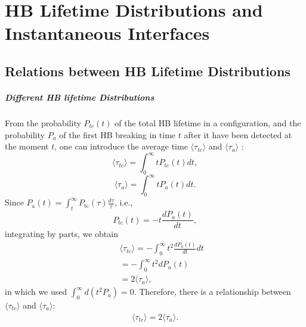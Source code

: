 \chapter{HB Lifetime Distributions and Instantaneous Interfaces}
\section{Relations between HB Lifetime Distributions}\label{relation_hbd}
\paragraph{Different HB lifetime Distributions}\label{diff_distr}
From the probability $P_{tc}(t)$ of the total HB lifetime in a configuration, and the probability $P_{a}$ of 
the first HB breaking in time $t$ after it have been detected at the moment $t$, one can introduce the average time 
$\langle \tau_{tc}\rangle$ and $\langle \tau_{a}\rangle$ :
\begin{equation}
\langle \tau_{tc}\rangle = \int_0^\infty t P_{tc}(t) dt,
\label{eq:tau_tc}
\end{equation}
\begin{equation}
\langle \tau_{a}\rangle = \int_0^\infty t P_a(t) dt. 
\label{eq:tau_a}
\end{equation}
Since $P_{\mathrm{a}}(t)=\int_{t}^{\infty} P_{\mathrm{tc}}(\tau) \frac{d \tau}{\tau}$, i.e., 
\begin{equation}
P_{tc}(t) = -t\frac{dP_a(t)}{dt}, \nonumber
\label{eq:relation_Ptc--Pa}
\end{equation}
integrating by parts, we obtain
\begin{eqnarray}
&&\langle \tau_{tc}\rangle = -\int_0^\infty t^2 \frac{dP_a(t)}{dt}dt \nonumber \\
&&= -\int_0^\infty t^2 dP_a(t) \nonumber\\
&&= 2\langle \tau_{a}\rangle,\nonumber
\end{eqnarray}
in which we used $\int_0^\infty d(t^2 P_a)=0$.
Therefore, there is a relationship between $\langle \tau_{tc} \rangle$ and $\langle \tau_a \rangle$:
\begin{eqnarray}
\langle \tau_{tc}\rangle = 2\langle \tau_{a}\rangle.
\label{eq:relation_tau_tc--t_a}
\end{eqnarray}

